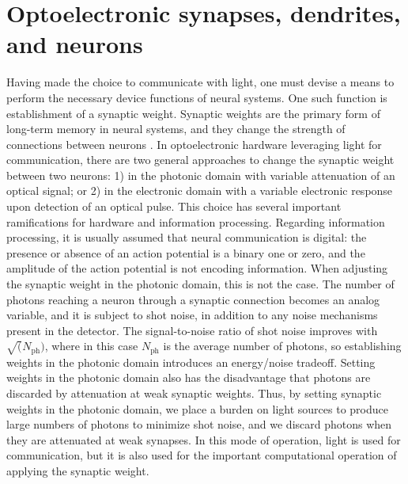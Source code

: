 \documentclass[twocolumn]{article}
\begin{document}
\section{\label{sec:synapsesDendritesAndNeurons}Optoelectronic synapses, dendrites, and neurons}
Having made the choice to communicate with light, one must devise a means to perform the necessary device functions of neural systems. One such function is establishment of a synaptic weight. Synaptic weights are the primary form of long-term memory in neural systems, and they change the strength of connections between neurons \cite{daab2001,geki2002}. In optoelectronic hardware leveraging light for communication, there are two general approaches to change the synaptic weight between two neurons: 1) in the photonic domain with variable attenuation of an optical signal; or 2) in the electronic domain with a variable electronic response upon detection of an optical pulse. This choice has several important ramifications for hardware and information processing. Regarding information processing, it is usually assumed that neural communication is digital: the presence or absence of an action potential is a binary one or zero, and the amplitude of the action potential is not encoding information. When adjusting the synaptic weight in the photonic domain, this is not the case. The number of photons reaching a neuron through a synaptic connection becomes an analog variable, and it is subject to shot noise, in addition to any noise mechanisms present in the detector. The signal-to-noise ratio of shot noise improves with $\sqrt(N_{\mathrm{ph}})$, where in this case $N_{\mathrm{ph}}$ is the average number of photons, so establishing weights in the photonic domain introduces an energy/noise tradeoff. Setting weights in the photonic domain also has the disadvantage that photons are discarded by attenuation at weak synaptic weights. Thus, by setting synaptic weights in the photonic domain, we place a burden on light sources to produce large numbers of photons to minimize shot noise, and we discard photons when they are attenuated at weak synapses. In this mode of operation, light is used for communication, but it is also used for the important computational operation of applying the synaptic weight.
\end{document}
